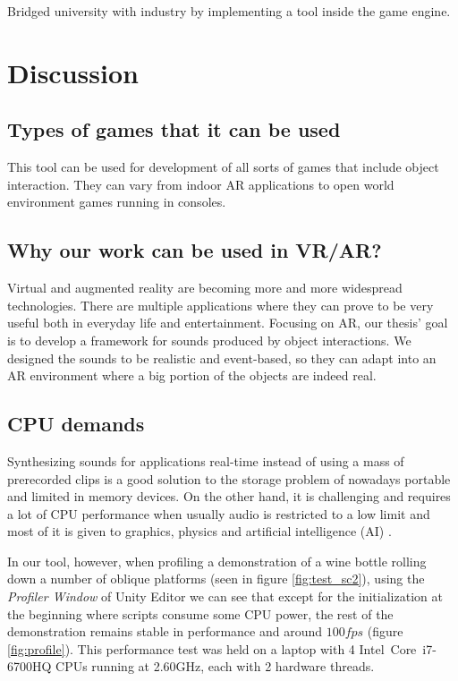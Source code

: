 Bridged university with industry by implementing a tool inside the game engine.

\section{Discussion}

\subsection{Types of games that it can be used}
This tool can be used for development of all sorts of games that include object interaction. They can vary from indoor AR applications to open world environment games running in consoles. 

\subsection{Why our work can be used in VR/AR?}
Virtual and augmented reality are becoming more and more widespread technologies. There are multiple applications where they can prove to be very useful both in everyday life and entertainment. Focusing on AR, our thesis' goal is to develop a framework for sounds produced by object interactions. We designed the sounds to be realistic and event-based, so they can adapt into an AR environment where a big portion of the objects are indeed real.


\subsection{CPU demands}
Synthesizing sounds for applications real-time instead of using a mass of prerecorded clips is a good solution to the storage problem of nowadays portable and limited in memory devices. On the other hand, it is challenging and requires a lot of CPU performance when usually audio is restricted to a low limit and most of it is given to graphics, physics and artificial intelligence (AI) \cite{lloyd2011sound}. 

In our tool, however, when profiling a demonstration of a wine bottle rolling down a number of oblique platforms (seen in figure \ref{fig:test_sc2}), using the \textit{Profiler Window} of Unity\textsuperscript{\textregistered} Editor we can see that except for the initialization at the beginning where scripts consume some CPU power, the rest of the demonstration remains stable in performance and around $100 fps$ (figure \ref{fig:profile}). This performance test was held on a laptop with 4 Intel\textregistered\ Core\texttrademark\ i7-6700HQ CPUs running at 2.60GHz, each with 2 hardware threads.

